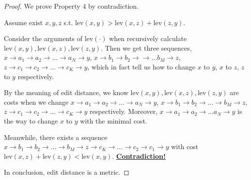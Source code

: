 \documentclass{article}
\begin{document}
\begin{proof}
    \hspace{1.3em} We prove Property 4 by contradiction.

    \hspace{1.3em}
    Assume exist $x,y,z$ s.t. $\mathrm{lev}(x,y)>\mathrm{lev}(x,z)+\mathrm{lev}(z,y).$

    \hspace{1.3em}
    Consider the arguments of $\mathrm{lev}(\cdot)$ when recursively calculate $\mathrm{lev}(x,y), \mathrm{lev}(x,z), \mathrm{lev}(z,y)$. Then we get three sequences, $x \to a_1 \to a_2 \to \dots \to a_N \to y$, $x \to b_1 \to b_2 \to \to \dots b_M \to z$, $z \to c_1 \to c_2 \to \dots \to c_K \to y$, which in fact tell us how to change $x$ to $y$, $x$ to $z$, $z$ to $y$ respectively. 

    \hspace{1.3em}
    By the meaning of edit distance, we know $\mathrm{lev}(x,y), \mathrm{lev}(x,z), \mathrm{lev}(z,y)$ are costs when we change $x \to a_1 \to a_2 \to \dots \to a_N \to y$, $x \to b_1 \to b_2 \to \dots \to b_M \to z$, $z \to c_1 \to c_2 \to \dots \to c_K \to y$ respectively. Moreover, $x \to a_1 \to a_2 \to \dots a_N \to y$ is the way to change $x$ to $y$ with the minimal cost.

    \hspace{1.3em}
    Meanwhile, there exists a sequence $x\to b_1 \to b_2 \to \dots \to b_M \to z \to c_K \to \dots \to c_2 \to c_1 \to y$ with cost $\mathrm{lev}(x,z)+\mathrm{lev}(z,y)<\mathrm{lev}(x,y)$. \underline{\textbf{Contradiction!}}

    \vspace{1em} \hspace{1.3em}
    In conclusion, edit distance is a metric.
\end{proof}

\vspace{1em}
\end{document}

